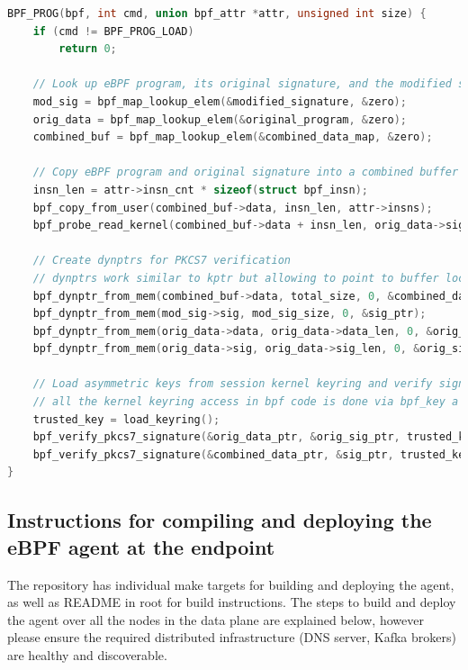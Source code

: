 \documentclass [11pt, proquest] {uwthesis}[2020/02/24]
\begin{document}
\begin{lstlisting}[language=C, caption={Kernel BPF LSM Hook for PKCS7 Signature Verification}, label={lst:bpf-lsm}]
BPF_PROG(bpf, int cmd, union bpf_attr *attr, unsigned int size) {
    if (cmd != BPF_PROG_LOAD)
        return 0;

    // Look up eBPF program, its original signature, and the modified signature
    mod_sig = bpf_map_lookup_elem(&modified_signature, &zero);
    orig_data = bpf_map_lookup_elem(&original_program, &zero);
    combined_buf = bpf_map_lookup_elem(&combined_data_map, &zero);

    // Copy eBPF program and original signature into a combined buffer
    insn_len = attr->insn_cnt * sizeof(struct bpf_insn);
    bpf_copy_from_user(combined_buf->data, insn_len, attr->insns);
    bpf_probe_read_kernel(combined_buf->data + insn_len, orig_data->sig_len, orig_data->sig);

    // Create dynptrs for PKCS7 verification
    // dynptrs work similar to kptr but allowing to point to buffer location storing large amount of data as in case of signature for eBPF verifier requirements. 
    bpf_dynptr_from_mem(combined_buf->data, total_size, 0, &combined_data_ptr);
    bpf_dynptr_from_mem(mod_sig->sig, mod_sig_size, 0, &sig_ptr);
    bpf_dynptr_from_mem(orig_data->data, orig_data->data_len, 0, &orig_data_ptr);
    bpf_dynptr_from_mem(orig_data->sig, orig_data->sig_len, 0, &orig_sig_ptr);

    // Load asymmetric keys from session kernel keyring and verify signatures
    // all the kernel keyring access in bpf code is done via bpf_key a wrapper over kernel core key structure accessed from userspace via keyctl
    trusted_key = load_keyring();
    bpf_verify_pkcs7_signature(&orig_data_ptr, &orig_sig_ptr, trusted_key);
    bpf_verify_pkcs7_signature(&combined_data_ptr, &sig_ptr, trusted_key);
}
\end{lstlisting}

\subsection{Instructions for compiling and deploying the eBPF agent at the endpoint}
The repository has individual make targets for building and deploying the agent, as well as README in root for build instructions. The steps to build and deploy the agent over all the nodes in the data plane are explained below, however please ensure the required distributed infrastructure (DNS server, Kafka brokers) are healthy and discoverable.
\end{document}
